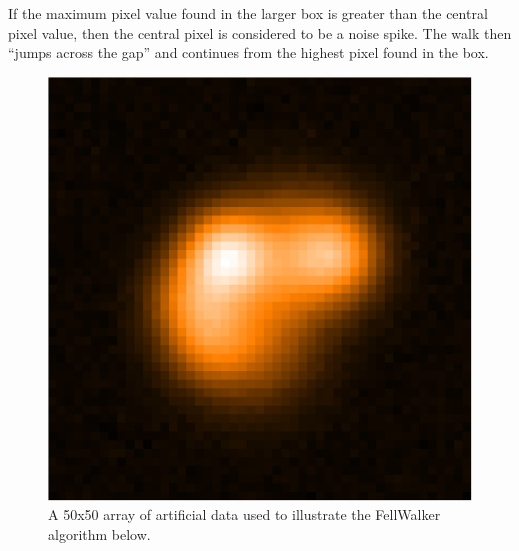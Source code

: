 \documentclass[final,authoryear,5p,times,twocolumn]{elsarticle}
\begin{document}
If the maximum pixel value found in the larger box is greater than the
central pixel value, then the central pixel is considered to be a noise
spike. The walk then ``jumps across the gap'' and continues from the
highest pixel found in the box.

\begin{figure}
\includegraphics[width=\columnwidth]{sim}
\caption{A 50x50 array of artificial data used to illustrate the
FellWalker algorithm below.}
\label{fig:sim}
\end{figure}
\end{document}
